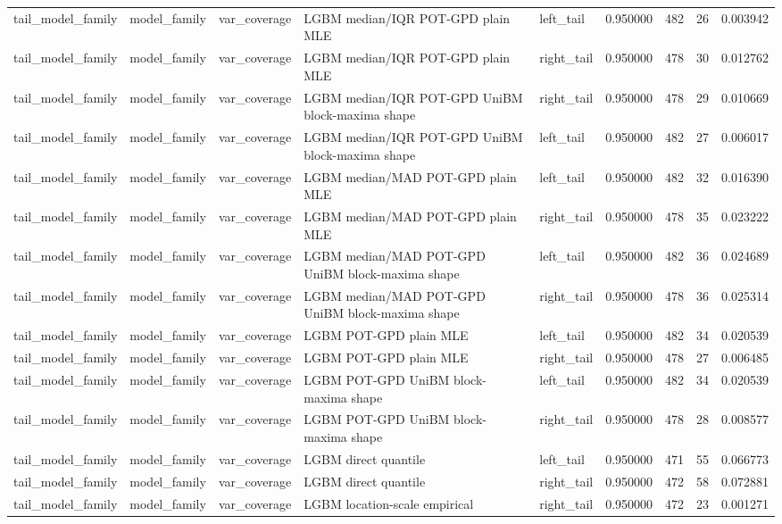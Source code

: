 \begin{tabular}{lllllrrrr}
tail\_model\_family & model\_family & var\_coverage & LGBM median/IQR POT-GPD plain MLE & left\_tail & 0.950000 & 482 & 26 & 0.003942 \\
tail\_model\_family & model\_family & var\_coverage & LGBM median/IQR POT-GPD plain MLE & right\_tail & 0.950000 & 478 & 30 & 0.012762 \\
tail\_model\_family & model\_family & var\_coverage & LGBM median/IQR POT-GPD UniBM block-maxima shape & right\_tail & 0.950000 & 478 & 29 & 0.010669 \\
tail\_model\_family & model\_family & var\_coverage & LGBM median/IQR POT-GPD UniBM block-maxima shape & left\_tail & 0.950000 & 482 & 27 & 0.006017 \\
tail\_model\_family & model\_family & var\_coverage & LGBM median/MAD POT-GPD plain MLE & left\_tail & 0.950000 & 482 & 32 & 0.016390 \\
tail\_model\_family & model\_family & var\_coverage & LGBM median/MAD POT-GPD plain MLE & right\_tail & 0.950000 & 478 & 35 & 0.023222 \\
tail\_model\_family & model\_family & var\_coverage & LGBM median/MAD POT-GPD UniBM block-maxima shape & left\_tail & 0.950000 & 482 & 36 & 0.024689 \\
tail\_model\_family & model\_family & var\_coverage & LGBM median/MAD POT-GPD UniBM block-maxima shape & right\_tail & 0.950000 & 478 & 36 & 0.025314 \\
tail\_model\_family & model\_family & var\_coverage & LGBM POT-GPD plain MLE & left\_tail & 0.950000 & 482 & 34 & 0.020539 \\
tail\_model\_family & model\_family & var\_coverage & LGBM POT-GPD plain MLE & right\_tail & 0.950000 & 478 & 27 & 0.006485 \\
tail\_model\_family & model\_family & var\_coverage & LGBM POT-GPD UniBM block-maxima shape & left\_tail & 0.950000 & 482 & 34 & 0.020539 \\
tail\_model\_family & model\_family & var\_coverage & LGBM POT-GPD UniBM block-maxima shape & right\_tail & 0.950000 & 478 & 28 & 0.008577 \\
tail\_model\_family & model\_family & var\_coverage & LGBM direct quantile & left\_tail & 0.950000 & 471 & 55 & 0.066773 \\
tail\_model\_family & model\_family & var\_coverage & LGBM direct quantile & right\_tail & 0.950000 & 472 & 58 & 0.072881 \\
tail\_model\_family & model\_family & var\_coverage & LGBM location-scale empirical & right\_tail & 0.950000 & 472 & 23 & 0.001271 \\

\end{tabular}
